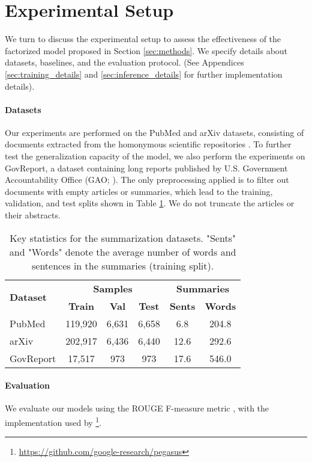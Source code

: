 \documentclass[11pt,table]{article}
\begin{document}
\section{Experimental Setup}
\label{sec:experiments}
We turn to discuss the experimental setup to assess the effectiveness of the factorized model proposed in Section \ref{sec:methods}. We specify details about datasets, baselines, and the evaluation protocol. (See Appendices \ref{sec:training_details} and \ref{sec:inference_details} for further implementation details).

\paragraph{Datasets}
Our experiments are performed on the PubMed and arXiv datasets, consisting of documents extracted from the homonymous scientific repositories \citep{cohan2018discourse}. To further test the generalization capacity of the model, we also perform the experiments on GovReport, a dataset containing long reports published by
U.S. Government Accountability Office (GAO; \citealt{huang2021efficient}). The only preprocessing applied is to filter out documents with empty articles or summaries, which lead to the training, validation, and test splits shown in Table \ref{tab:dataset_statistics}. We do not truncate the articles or their abstracts.
\begin{table}
  \setlength\tabcolsep{2.5pt}
  \centering
  \begin{tabular}{lccccc}
    \toprule
    \multicolumn{1}{l}{\multirow{2}{1cm}{\centering \textbf{Dataset}}} & \multicolumn{3}{c}{ \textbf{Samples}} & \multicolumn{2}{c}{ \textbf{Summaries}} \\
    \cmidrule(r){2-4} \cmidrule(r){5-6}
     &  \textbf{Train} &  \textbf{Val} &  \textbf{Test} &  \textbf{Sents} &  \textbf{Words} \\
    \midrule
    PubMed & 119,920 & 6,631 & 6,658 & 6.8 & 204.8 \\
    arXiv & 202,917 & 6,436 & 6,440 & 12.6 & 292.6 \\
    GovReport & 17,517 & 973 & 973 & 17.6 & 546.0  \\
    \bottomrule
  \end{tabular}
  \caption{Key statistics for the summarization datasets. "Sents" and "Words" denote the average number of words and sentences in the summaries (training split).}\label{tab:dataset_statistics}
\end{table}

\paragraph{Evaluation}
We evaluate our models using the ROUGE F-measure metric \citep{lin2004rouge}, with the implementation used by \footnote{\url{https://github.com/google-research/pegasus}}.
\end{document}
